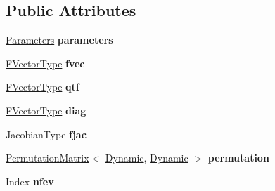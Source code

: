 \subsection*{Public Attributes}
\begin{DoxyCompactItemize}
\item 
\mbox{\label{class_eigen_1_1_levenberg_marquardt_a3ef697e5bd259bfcfa0c8b413a2f167d}} 
\hyperlink{struct_eigen_1_1_levenberg_marquardt_1_1_parameters}{Parameters} {\bfseries parameters}
\item 
\mbox{\label{class_eigen_1_1_levenberg_marquardt_a9b00b65a3ca96df91fab2b0a7f22f9c7}} 
\hyperlink{group___core___module}{F\+Vector\+Type} {\bfseries fvec}
\item 
\mbox{\label{class_eigen_1_1_levenberg_marquardt_aa34d7013c00ceed3166acba516b0538c}} 
\hyperlink{group___core___module}{F\+Vector\+Type} {\bfseries qtf}
\item 
\mbox{\label{class_eigen_1_1_levenberg_marquardt_a41ac4eb082fcf86911abe6c0443807cc}} 
\hyperlink{group___core___module}{F\+Vector\+Type} {\bfseries diag}
\item 
\mbox{\label{class_eigen_1_1_levenberg_marquardt_adfa100bb0f5d0abd3dbff94800c08b9c}} 
Jacobian\+Type {\bfseries fjac}
\item 
\mbox{\label{class_eigen_1_1_levenberg_marquardt_acf168aa9f049f4920ad22c50b170c872}} 
\hyperlink{group___core___module_class_eigen_1_1_permutation_matrix}{Permutation\+Matrix}$<$ \hyperlink{namespace_eigen_ad81fa7195215a0ce30017dfac309f0b2}{Dynamic}, \hyperlink{namespace_eigen_ad81fa7195215a0ce30017dfac309f0b2}{Dynamic} $>$ {\bfseries permutation}
\item 
\mbox{\label{class_eigen_1_1_levenberg_marquardt_a73420eb0d25ef0cf050f94168d0e7e02}} 
Index {\bfseries nfev}
\item 
\mbox{\label{class_eigen_1_1_levenberg_marquardt_af49b9fd5194c0e9abe949a00b9096f8b}} 

\end{DoxyCompactItemize}
